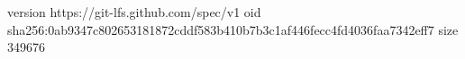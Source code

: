 version https://git-lfs.github.com/spec/v1
oid sha256:0ab9347c802653181872cddf583b410b7b3c1af446fecc4fd4036faa7342eff7
size 349676
